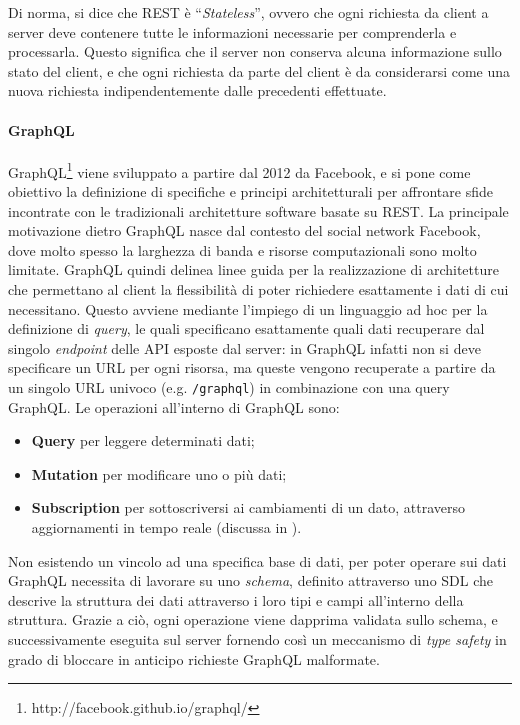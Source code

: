 Di norma, si dice che \ac{REST} è ``\textit{Stateless}'', ovvero che ogni richiesta da client a server deve contenere tutte le informazioni necessarie
per comprenderla e processarla. Questo significa che il server non conserva alcuna informazione sullo stato del client, e che ogni richiesta da parte
del client è da considerarsi come una nuova richiesta indipendentemente dalle precedenti effettuate.

\paragraph{GraphQL}\label{par:gql}
GraphQL\footnote{http://facebook.github.io/graphql/} viene sviluppato a partire dal 2012 da Facebook, e si pone come obiettivo la definizione di specifiche e principi architetturali
per affrontare sfide incontrate con le tradizionali architetture software basate su \ac{REST}. La principale motivazione dietro GraphQL nasce dal
contesto del social network Facebook, dove molto spesso la larghezza di banda e risorse computazionali sono molto limitate. GraphQL quindi delinea
linee guida per la realizzazione di architetture che permettano al client la flessibilità di poter richiedere esattamente i dati di cui necessitano.
Questo avviene mediante l'impiego di un linguaggio ad hoc per la definizione di \textit{query}, le quali specificano esattamente quali dati recuperare
dal singolo \textit{endpoint} delle API esposte dal server: in GraphQL infatti non si deve specificare un URL per ogni risorsa, ma queste vengono 
recuperate a partire da un singolo URL univoco (e.g. \texttt{/graphql}) in combinazione con una query GraphQL.
Le operazioni all'interno di GraphQL sono:
\begin{itemize}
    \item \textbf{Query} per leggere determinati dati;
    \item \textbf{Mutation} per modificare uno o più dati;
    \item \textbf{Subscription} per sottoscriversi ai cambiamenti di un dato, attraverso aggiornamenti in tempo reale (discussa in ).
\end{itemize}
Non esistendo un vincolo ad una specifica base di dati, per poter operare sui dati GraphQL necessita di lavorare su uno \textit{schema}, definito
attraverso uno \ac{SDL} che descrive la struttura dei dati attraverso i loro tipi e campi all'interno della struttura. Grazie a ciò, ogni operazione
viene dapprima validata sullo schema, e successivamente eseguita sul server fornendo così un meccanismo di \textit{type safety} in grado di bloccare
in anticipo richieste GraphQL malformate.

